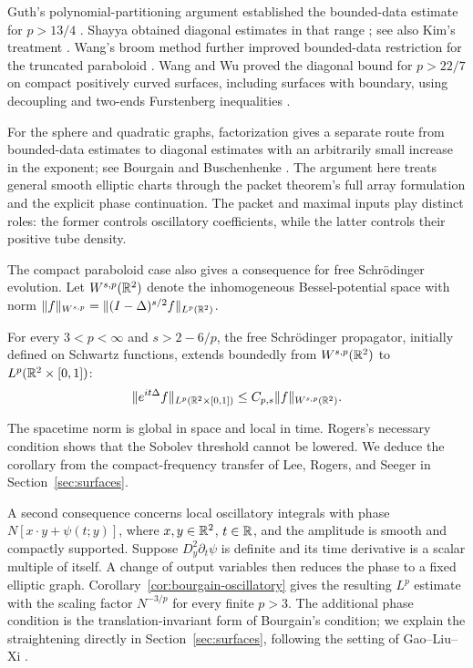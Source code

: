 Guth's polynomial-partitioning argument
established the bounded-data estimate for \(p>13/4\)
\cite[Theorem~0.1]{Guth2016}. Shayya obtained diagonal estimates in that range
\cite[Corollary~2.1(iii)]{Shayya2017}; see also Kim's treatment
\cite[Theorem~1.2 and the following remark]{Kim2017}. Wang's broom
method further improved bounded-data restriction for the truncated
paraboloid \cite[Theorem~1.4]{Wang2022Brooms}. Wang and Wu proved
the diagonal bound for \(p>22/7\) on compact positively curved
surfaces, including surfaces with boundary, using decoupling and
two-ends Furstenberg inequalities \cite[Theorem~0.2]{WangWu2024}.

For the sphere and quadratic graphs, factorization gives a separate
route from bounded-data estimates to diagonal estimates with an
arbitrarily small increase in the exponent; see
Bourgain \cite{Bourgain1991Besicovitch} and Buschenhenke
\cite[Theorem~1.1 and Remark~1.6]{Buschenhenke2024}. The argument here treats general smooth
elliptic charts through the packet theorem's full array formulation
and the explicit phase continuation. The packet and maximal inputs
play distinct roles: the former controls oscillatory coefficients,
while the latter controls their positive tube density.

The compact paraboloid case also gives a consequence for free
Schr\"odinger evolution. Let \(W^{s,p}(\mathbb R^2)\) denote the inhomogeneous
Bessel-potential space with norm
\(\|f\|_{W^{s,p}}=\|(I-\Delta)^{s/2}f\|_{L^p(\mathbb R^2)}\).

\begin{corollary}\label{cor:schrodinger-smoothing}
For every \(3<p<\infty\) and \(s>2-6/p\), the free Schr\"odinger
propagator, initially defined on Schwartz functions, extends boundedly
from \(W^{s,p}(\mathbb R^2)\) to \(L^p(\mathbb R^2\times[0,1])\):
\begin{equation}\label{eq:schrodinger-smoothing}
 \|e^{it\Delta}f\|_{L^p(\mathbb R^2\times[0,1])}
 \le C_{p,s}\|f\|_{W^{s,p}(\mathbb R^2)}.
\end{equation}
\end{corollary}

The spacetime norm is global in space and local in time. Rogers's necessary
condition \cite[Section~2]{Rogers2008} shows that the Sobolev threshold
cannot be lowered. We deduce the corollary from the compact-frequency
transfer of Lee, Rogers, and Seeger \cite[Theorem~1.1]{LeeRogersSeeger2013}
in Section~\ref{sec:surfaces}.

A second consequence concerns local oscillatory integrals with phase
\(N[x\cdot y+\psi(t;y)]\), where \(x,y\in\mathbb R^2\), \(t\in\mathbb R\),
and the amplitude is smooth and compactly supported. Suppose
\(D_y^2\partial_t\psi\) is definite and its time derivative is a
scalar multiple of itself. A change of output variables then reduces
the phase to a fixed elliptic graph. Corollary~\ref{cor:bourgain-oscillatory}
gives the resulting \(L^p\) estimate with the scaling factor
\(N^{-3/p}\) for every finite \(p>3\). The additional phase condition
is the translation-invariant form of Bourgain's condition; we explain
the straightening directly in Section~\ref{sec:surfaces}, following
the setting of Gao--Liu--Xi \cite{GaoLiuXi2025}.

